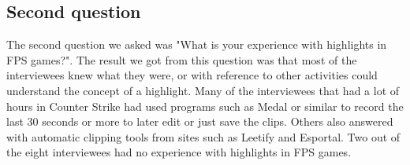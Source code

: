 \documentclass[a4paper,twoside]{bth}
\begin{document}
\subsection{Second question}
The second question we asked was "What is your experience with highlights in FPS games?". The result we got from this question was that most of the interviewees knew what they were, or with reference to other activities could understand the concept of a highlight. Many of the interviewees that had a lot of hours in Counter Strike had used programs such as Medal or similar to record the last 30 seconds or more to later edit or just save the clips. Others also answered with automatic clipping tools from sites such as Leetify and Esportal. Two out of the eight interviewees had no experience with highlights in FPS games.\\\\
\end{document}
